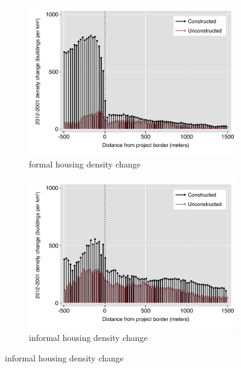 \documentclass[12pt]{article}
\begin{document}
\begin{figure}[t!]
        \centering
        \caption[ Changes in Housing Densities in Constructed and Unconstructed Projects Areas]
        {\small Changes in Housing Densities in Constructed and Unconstructed projects } 
        \begin{subfigure}[b]{0.495\textwidth}   
            \centering 
            \includegraphics[width=\textwidth,trim={0.3cm .3cm 0.1cm 0cm}, clip=true]{figures/bblu_for_rawchanges_4_spk}
            \caption[]%
            {{\small formal housing density change}}    
            \label{fig:forchange}
        \end{subfigure}
        \hfill
        \begin{subfigure}[b]{0.495\textwidth}   
            \centering 
            \includegraphics[width=\textwidth,trim={0.3cm .3cm 0.1cm 0cm}, clip=true]{figures/bblu_inf_rawchanges_4_spk}
            \caption[]%
            {{\small informal housing density change}}    
            \label{fig:infchange}
        \end{subfigure}
        \label{fig:rawbblumeanschange}
        \vspace{-6mm}
    \end{figure} 
\end{document}
